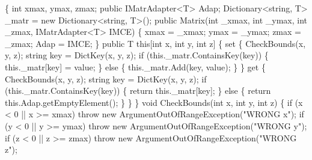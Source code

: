 \begin{DoxyCode}
    \{
        \textcolor{keywordtype}{int} xmax, ymax, zmax;
        \textcolor{keyword}{public} IMatrAdapter<T> Adap;
        Dictionary<string, T> \_matr = \textcolor{keyword}{new} Dictionary<string, T>();
        \textcolor{keyword}{public} Matrix(\textcolor{keywordtype}{int} \_xmax, \textcolor{keywordtype}{int} \_ymax, \textcolor{keywordtype}{int} \_zmax, IMatrAdapter<T> IMCE)
        \{
            xmax = \_xmax;
            ymax = \_ymax;
            zmax = \_zmax;
            Adap = IMCE;
        \}
        \textcolor{keyword}{public} T \textcolor{keyword}{this}[\textcolor{keywordtype}{int} x, \textcolor{keywordtype}{int} y, \textcolor{keywordtype}{int} z]
        \{
            \textcolor{keyword}{set}
            \{
                CheckBounds(x, y, z);
                \textcolor{keywordtype}{string} key = DictKey(x, y, z);
                \textcolor{keywordflow}{if} (this.\_matr.ContainsKey(key))
                \{
                    this.\_matr[key] = value;
                \}
                \textcolor{keywordflow}{else}
                \{
                    this.\_matr.Add(key, value);
                \}
            \}
            \textcolor{keyword}{get}
            \{
                CheckBounds(x, y, z);
                \textcolor{keywordtype}{string} key = DictKey(x, y, z);
                \textcolor{keywordflow}{if} (this.\_matr.ContainsKey(key))
                \{
                    \textcolor{keywordflow}{return} this.\_matr[key];
                \}
                \textcolor{keywordflow}{else}
                \{
                    \textcolor{keywordflow}{return} this.Adap.getEmptyElement();
                \}
            \}
        \}
        \textcolor{keywordtype}{void} CheckBounds(\textcolor{keywordtype}{int} x, \textcolor{keywordtype}{int} y, \textcolor{keywordtype}{int} z)
        \{
            \textcolor{keywordflow}{if} (x < 0 || x >= xmax)
                \textcolor{keywordflow}{throw} \textcolor{keyword}{new} ArgumentOutOfRangeException(\textcolor{stringliteral}{"WRONG x"});
            \textcolor{keywordflow}{if} (y < 0 || y >= ymax)
                \textcolor{keywordflow}{throw} \textcolor{keyword}{new} ArgumentOutOfRangeException(\textcolor{stringliteral}{"WRONG y"});
            \textcolor{keywordflow}{if} (z < 0 || z >= zmax)
                \textcolor{keywordflow}{throw} \textcolor{keyword}{new} ArgumentOutOfRangeException(\textcolor{stringliteral}{"WRONG z"});


\end{DoxyCode}
